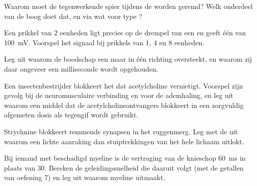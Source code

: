 \begin{exercise}[$\star\star$]\label{exo:g12:stretch-reflex:9}
Waarom moet de tegenwerkende spier tijdens de  worden geremd? Welk
onderdeel van de boog doet dat, en via wat voor type ?
\end{exercise}

\begin{exercise}[$\star\star$]\label{exo:g12:stretch-reflex:10}
Een prikkel van 2 eenheden ligt precies op de drempel van een  en
geeft één  van \qty{100}{mV}. Voorspel het signaal bij
prikkels van 1, 4 en 8 eenheden.
\end{exercise}

\begin{exercise}[$\star\star$]\label{exo:g12:stretch-reflex:11}
Leg uit waarom de boodschap een  maar in één richting oversteekt, en
waarom zij daar ongeveer een milliseconde wordt opgehouden.
\end{exercise}

\begin{exercise}[$\star\star\star$]\label{exo:g12:stretch-reflex:12}
Een insectenbestrijder blokkeert het  dat acetylcholine vernietigt.
Voorspel zijn gevolg bij de neuromusculaire verbinding en voor de
ademhaling, en leg uit waarom een middel dat de acetylcholineontvangers
blokkeert in een zorgvuldig afgemeten dosis als tegengif wordt gebruikt.
\end{exercise}

\begin{exercise}[$\star\star\star$]\label{exo:g12:stretch-reflex:13}
Strychnine blokkeert remmende synapsen in het ruggenmerg. Leg met de
 uit waarom een lichte aanraking dan stuiptrekkingen van het
hele lichaam uitlokt.
\end{exercise}

\begin{exercise}[$\star\star\star$]\label{exo:g12:stretch-reflex:14}
Bij iemand met beschadigd myeline is de vertraging van de knieschop
\qty{60}{ms} in plaats van 30. Bereken de geleidingssnelheid die daaruit
volgt (met de getallen van oefening 7) en leg uit waarom myeline uitmaakt.
\end{exercise}

